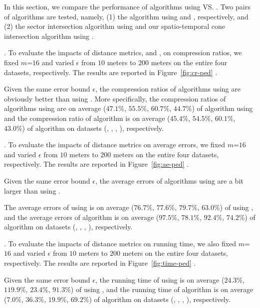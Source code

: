 {In this section, we compare the performance of algorithms using \ped VS. \sed. Two pairs of algorithms are tested, namely, (1) the algorithm \dpa using \ped and \sed, respectively, and (2) the sector intersection  algorithm \cite{Williams:Longest, Sklansky:Cone} using \ped and our spatio-temporal cone intersection algorithm using \sed.

.
To evaluate the impacts of distance metrics, \ie \ped and \sed, on compression ratios, we fixed {$m$=$16$} and varied $\epsilon$ from $10$ meters to $200$ meters on the entire four datasets, respectively.
The results are reported in Figure~\ref{fig:cr-ped} .


Given the same error bound $\epsilon$, the compression ratios of algorithms using \ped are obviously better
than using \sed.
More specifically, the compression ratios of algorithms \dpa 
using \ped are on average ($47.1\%$, $55.5\%$, $60.7\%$, $44.7\%$) of algorithm \dpa using \sed and
the compression ratio of algorithm \cist is on average
($45.4\%$, $54.5\%$, $60.1\%$, $43.0\%$) of algorithm \cia  on datasets (\sercar, \geolife, \mopsi, \pricar), respectively.



.
To evaluate the impacts of distance metrics on average errors, we fixed {$m$=$16$} and varied $\epsilon$ from $10$ meters to $200$ meters on the entire four datasets, respectively.
The results are reported in Figure~\ref{fig:ae-ped} .


Given the same error bound $\epsilon$, the average errors of algorithms using \sed are a bit larger than using \ped. 

The average errors of \dpa  using \ped is on average
($76.7\%$, $77.6\%$, $79.7\%$, $63.0\%$) of \dpa  using \sed, and  the average
errors of algorithm \cia  is on average
($97.5\%$, $78.1\%$, $92.4\%$, $74.2\%$) of algorithm \cist on datasets (\sercar, \geolife, \mopsi, \pricar), respectively.



.
To evaluate the impacts of distance metrics on running time, we also fixed {$m$=$16$} and varied $\epsilon$ from $10$ meters to $200$ meters on the entire four datasets, respectively.
The results are reported in Figure~\ref{fig:time-ped} .

Given the same error bound $\epsilon$, the running time of \dpa  using \ped is on average
($24.3\%$, $119.9\%$, $23.4\%$, $91.3\%$) of \dpa  using \sed, and  the running
time of algorithm \cia  is on average ($7.0\%$, $36.3\%$, $19.9\%$, $69.2\%$)
of algorithm \cist on datasets (\sercar, \geolife, \mopsi, \pricar), respectively.





}
